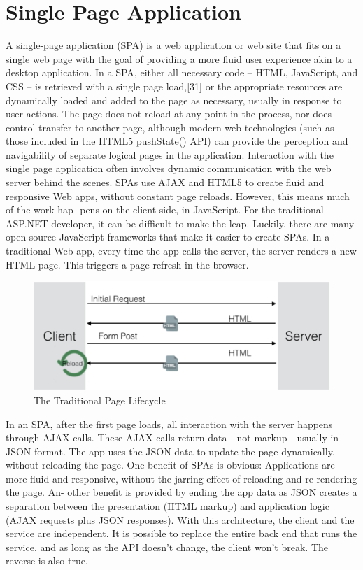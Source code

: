 \section{Single Page Application}
\label{sec:single_page_application}

A single-page application (SPA) is a web application or web site that fits on a single web page with the goal of providing a more fluid user experience akin to a desktop application. In a SPA, either all necessary code – HTML, JavaScript, and CSS – is retrieved with a single page load,[31] or the appropriate resources are dynamically loaded and added to the page as necessary, usually in response to user actions. The page does not reload at any point in the process, nor does control transfer to another page, although modern web technologies (such as those included in the HTML5 pushState() API) can provide the perception and navigability of separate logical pages in the application. Interaction with the single page application often involves dynamic communication with the web server behind the scenes. 
SPAs use AJAX and HTML5 to create fluid and responsive Web apps, without constant page reloads. However, this means much of the work hap- pens on the client side, in JavaScript. For the traditional ASP.NET developer, it can be difficult to make the leap. Luckily, there are many open source JavaScript frameworks that make it easier to create SPAs. 
In a traditional Web app, every time the app calls the server, the server renders a new HTML page. This triggers a page refresh in the browser.

\begin{figure}[htb] %
 \centering
 \includegraphics[width=1.0\linewidth]{images/chapter3/no_spa.png}\hfill
 \caption[The Traditional Page Lifecycle]{The Traditional Page Lifecycle}
 \label{fig:fourV}
\end{figure}

 In an SPA, after the first page loads, all interaction with the server happens through AJAX calls. These AJAX calls return data—not markup—usually in JSON format. The app uses the JSON data to update the page dynamically, without reloading the page. 
One benefit of SPAs is obvious: Applications are more fluid and responsive, without the jarring effect of reloading and re-rendering the page. An- other benefit is provided by ending the app data as JSON creates a separation between the presentation (HTML markup) and application logic (AJAX requests plus JSON responses). With this architecture, the client and the service are independent. It is possible to replace the entire back end that runs the service, and as long as the API doesn’t change, the client won’t break. The reverse is also true.

